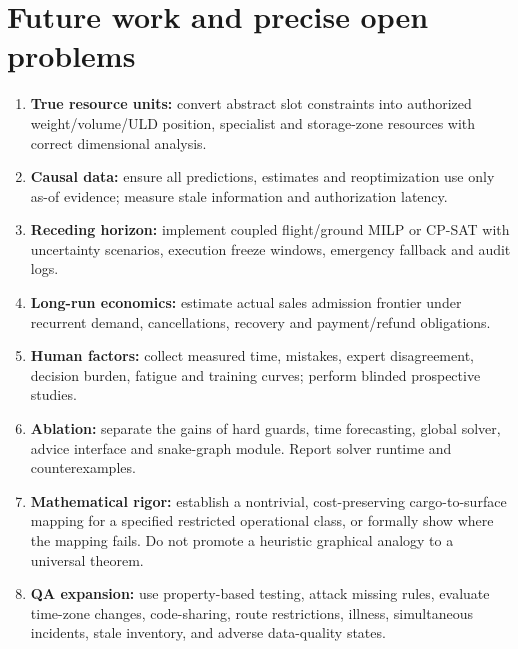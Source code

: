 \documentclass[10pt,a4paper]{article}
\theoremstyle{definition}\newtheorem{definition}[theorem]{Definition}
\theoremstyle{remark}\newtheorem{remark}[theorem]{Remark}
\newcommand{\1}{\mathbbm 1}
\begin{document}
\section{Future work and precise open problems}
\begin{enumerate}
\item \textbf{True resource units:} convert abstract slot constraints into authorized weight/volume/ULD position, specialist and storage-zone resources with correct dimensional analysis.
\item \textbf{Causal data:} ensure all predictions, estimates and reoptimization use only as-of evidence; measure stale information and authorization latency.
\item \textbf{Receding horizon:} implement coupled flight/ground MILP or CP-SAT with uncertainty scenarios, execution freeze windows, emergency fallback and audit logs.
\item \textbf{Long-run economics:} estimate actual sales admission frontier under recurrent demand, cancellations, recovery and payment/refund obligations.
\item \textbf{Human factors:} collect measured time, mistakes, expert disagreement, decision burden, fatigue and training curves; perform blinded prospective studies.
\item \textbf{Ablation:} separate the gains of hard guards, time forecasting, global solver, advice interface and snake-graph module. Report solver runtime and counterexamples.
\item \textbf{Mathematical rigor:} establish a nontrivial, cost-preserving cargo-to-surface mapping for a specified restricted operational class, or formally show where the mapping fails. Do not promote a heuristic graphical analogy to a universal theorem.
\item \textbf{QA expansion:} use property-based testing, attack missing rules, evaluate time-zone changes, code-sharing, route restrictions, illness, simultaneous incidents, stale inventory, and adverse data-quality states.
\end{enumerate}
\end{document}
